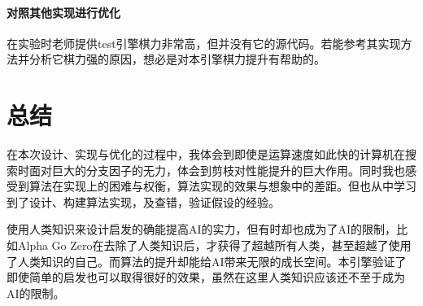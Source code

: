 \documentclass{ctexart}
\begin{document}
\paragraph{对照其他实现进行优化} 在实验时老师提供test引擎棋力非常高，但并没有它的源代码。若能参考其实现方法并分析它棋力强的原因，想必是对本引擎棋力提升有帮助的。

\section{总结}

在本次设计、实现与优化的过程中，我体会到即使是运算速度如此快的计算机在搜索时面对巨大的分支因子的无力，体会到剪枝对性能提升的巨大作用。同时我也感受到算法在实现上的困难与权衡，算法实现的效果与想象中的差距。但也从中学习到了设计、构建算法实现，及查错，验证假设的经验。

使用人类知识来设计启发的确能提高AI的实力，但有时却也成为了AI的限制，比如Alpha Go Zero在去除了人类知识后，才获得了超越所有人类，甚至超越了使用了人类知识的自己。而算法的提升却能给AI带来无限的成长空间。本引擎验证了即使简单的启发也可以取得很好的效果，虽然在这里人类知识应该还不至于成为AI的限制。
\end{document}

